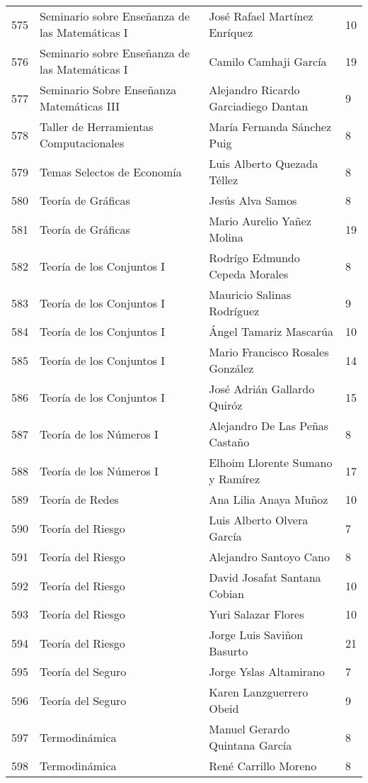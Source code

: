 \begin{table}[ht]
\begin{tabular}{rlll}
  575 & Seminario sobre Enseñanza de las Matemáticas I & José Rafael Martínez Enríquez & 10 \\ 
  576 & Seminario sobre Enseñanza de las Matemáticas I & Camilo Camhaji García & 19 \\ 
  577 & Seminario Sobre Enseñanza Matemáticas III & Alejandro Ricardo Garciadiego Dantan & 9 \\ 
  578 & Taller de Herramientas Computacionales & María Fernanda Sánchez Puig & 8 \\ 
  579 & Temas Selectos de Economía & Luis Alberto Quezada Téllez & 8 \\ 
  580 & Teoría de Gráficas & Jesús Alva Samos & 8 \\ 
  581 & Teoría de Gráficas & Mario Aurelio Yañez Molina & 19 \\ 
  582 & Teoría de los Conjuntos I & Rodrígo Edmundo Cepeda Morales & 8 \\ 
  583 & Teoría de los Conjuntos I & Mauricio Salinas Rodríguez & 9 \\ 
  584 & Teoría de los Conjuntos I & Ángel Tamariz Mascarúa & 10 \\ 
  585 & Teoría de los Conjuntos I & Mario Francisco Rosales González & 14 \\ 
  586 & Teoría de los Conjuntos I & José Adrián Gallardo Quiróz & 15 \\ 
  587 & Teoría de los Números I & Alejandro De Las Peñas Castaño & 8 \\ 
  588 & Teoría de los Números I & Elhoim Llorente Sumano y Ramírez & 17 \\ 
  589 & Teoría de Redes & Ana Lilia Anaya Muñoz & 10 \\ 
  590 & Teoría del Riesgo & Luis Alberto Olvera García & 7 \\ 
  591 & Teoría del Riesgo & Alejandro Santoyo Cano & 8 \\ 
  592 & Teoría del Riesgo & David Josafat Santana Cobian & 10 \\ 
  593 & Teoría del Riesgo & Yuri Salazar Flores & 10 \\ 
  594 & Teoría del Riesgo & Jorge Luis Saviñon Basurto & 21 \\ 
  595 & Teoría del Seguro & Jorge Yslas Altamirano & 7 \\ 
  596 & Teoría del Seguro & Karen Lanzguerrero Obeid & 9 \\ 
  597 & Termodinámica & Manuel Gerardo Quintana García & 8 \\ 
  598 & Termodinámica & René Carrillo Moreno & 8 \\ 

\end{tabular}
\end{table}
